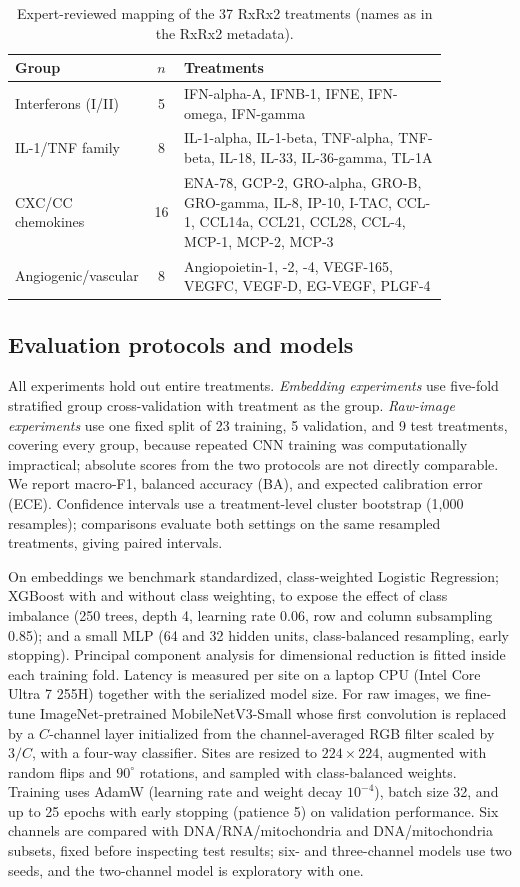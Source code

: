\documentclass[conference]{IEEEtran}
\begin{document}
\begin{table}[t]
\caption{Expert-reviewed mapping of the 37 RxRx2 treatments (names as in the RxRx2 metadata).}
\label{tab:mapping}
\centering
\footnotesize
\setlength{\tabcolsep}{3pt}
\begin{tabular}{p{0.25\linewidth}cp{0.61\linewidth}}
\toprule
Group & $n$ & Treatments \\
\midrule
Interferons (I/II) & 5 & IFN-alpha-A, IFNB-1, IFNE, IFN-omega, IFN-gamma \\
IL-1/TNF family & 8 & IL-1-alpha, IL-1-beta, TNF-alpha, TNF-beta, IL-18, IL-33, IL-36-gamma, TL-1A \\
CXC/CC chemokines & 16 & ENA-78, GCP-2, GRO-alpha, GRO-B, GRO-gamma, IL-8, IP-10, I-TAC, CCL-1, CCL14a, CCL21, CCL28, CCL-4, MCP-1, MCP-2, MCP-3 \\
Angiogenic/vascular & 8 & Angiopoietin-1, -2, -4, VEGF-165, VEGFC, VEGF-D, EG-VEGF, PLGF-4 \\
\bottomrule
\end{tabular}
\end{table}

\subsection{Evaluation protocols and models}
All experiments hold out entire treatments. \emph{Embedding experiments} use five-fold stratified group cross-validation with treatment as the group. \emph{Raw-image experiments} use one fixed split of 23 training, 5 validation, and 9 test treatments, covering every group, because repeated CNN training was computationally impractical; absolute scores from the two protocols are not directly comparable. We report macro-F1, balanced accuracy (BA), and expected calibration error (ECE). Confidence intervals use a treatment-level cluster bootstrap (1,000 resamples); comparisons evaluate both settings on the same resampled treatments, giving paired intervals.

On embeddings we benchmark standardized, class-weighted Logistic Regression; XGBoost \cite{chen2016} with and without class weighting, to expose the effect of class imbalance (250 trees, depth 4, learning rate 0.06, row and column subsampling 0.85); and a small MLP (64 and 32 hidden units, class-balanced resampling, early stopping). Principal component analysis for dimensional reduction is fitted inside each training fold. Latency is measured per site on a laptop CPU (Intel Core Ultra 7 255H) together with the serialized model size. For raw images, we fine-tune ImageNet-pretrained MobileNetV3-Small \cite{howard2019} whose first convolution is replaced by a $C$-channel layer initialized from the channel-averaged RGB filter scaled by $3/C$, with a four-way classifier. Sites are resized to $224\times224$, augmented with random flips and $90^\circ$ rotations, and sampled with class-balanced weights. Training uses AdamW (learning rate and weight decay $10^{-4}$), batch size 32, and up to 25 epochs with early stopping (patience 5) on validation performance. Six channels are compared with DNA/RNA/mitochondria and DNA/mitochondria subsets, fixed before inspecting test results; six- and three-channel models use two seeds, and the two-channel model is exploratory with one.
\end{document}
